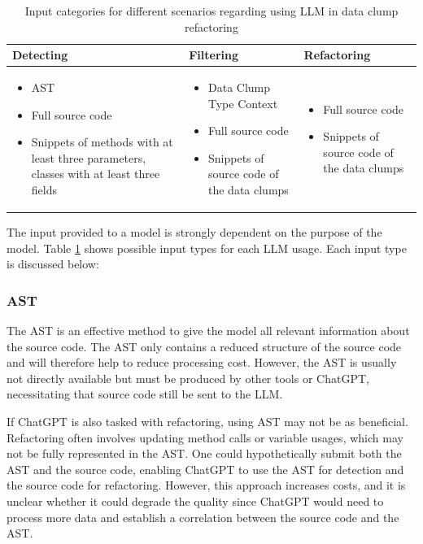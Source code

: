 \begin{table}[ht!]
    \centering
    \begin{tabular} {m{4cm} | m{4cm} | m{4cm}}
        Detecting & Filtering & Refactoring  \\\hline
         \begin{itemize}
             \item AST
             \item Full source code 
             \item Snippets of methods with at least three parameters, classes with at least three fields
         \end{itemize} & \begin{itemize}
             \item Data Clump Type Context
             \item Full source code
             \item Snippets of source code of the data clumps
         \end{itemize} & \begin{itemize}
             \item Full source code 
             \item Snippets of source code of the data clumps
         \end{itemize}
    \end{tabular}
    \caption{Input categories for different scenarios regarding using \ac{LLM} in data clump refactoring}
    \label{tab:data_clump_llm_input}
\end{table}

The input provided to a model is strongly dependent on the purpose of the model. Table \ref{tab:data_clump_llm_input} shows possible input types for each \ac{LLM} usage. Each input type is discussed below:

\subsubsection{AST}

The \ac{AST} is an effective method to give the model all relevant information about the source code.  The \ac{AST} only contains a reduced structure of the source code and will therefore help to reduce processing cost. However, the \ac{AST} is usually not directly available but must be produced by other tools or ChatGPT, necessitating that source code still be sent to the \ac{LLM}. 

If ChatGPT is also tasked with refactoring, using \ac{AST} may not be as beneficial. Refactoring often involves updating method calls or variable usages, which may not be fully represented in the \ac{AST}. One could hypothetically submit both the \ac{AST} and the source code, enabling ChatGPT to use the \ac{AST} for detection and the source code for refactoring. However, this approach increases costs, and it is unclear whether it could degrade the quality since ChatGPT would need to process more data and establish a correlation between the source code and the \ac{AST}.



